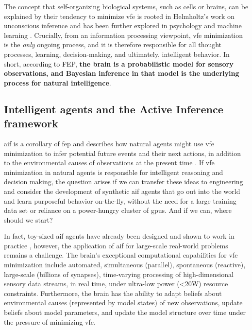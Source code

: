 The concept that self-organizing biological systems, such as cells or brains, can be explained by their tendency to minimize \ac{vfe} is rooted in Helmholtz's work on unconscious inference \citep{helmholtz66, meyering_helmholtzs_1989} and has been further explored in psychology \citep{gregory_perceptions_1980} and machine learning \citep{dayan_helmholtz_1995}. 
Crucially, from an information processing viewpoint, \ac{vfe} minimization is the \textit{only}
ongoing process, and it is therefore responsible for all thought processes, learning,
decision-making, and ultimately, intelligent behavior.
In short, according to FEP, \textbf{the brain is a probabilistic model for sensory observations, and Bayesian inference in that model is the underlying process for natural intelligence}.

\subsection{Intelligent agents and the Active Inference framework}

\Ac{aif} is a corollary of \ac{fep} and describes how
natural agents might use \ac{vfe} minimization to infer potential future events and their next actions, in addition to the environmental causes of observations at the present time \citep{smith_step-by-step_2021, de_vries_factor_2017}.
If \ac{vfe} minimization in natural agents is responsible for intelligent reasoning and
decision making, the question arises if we can transfer these ideas to engineering and
consider the development of synthetic \ac{aif} agents that go out into the world and learn
purposeful behavior on-the-fly, without the need for a large training data set or reliance on
a power-hungry cluster of \acp{gpu}. And if we can, where should we start?

In fact, toy-sized \ac{aif} agents have already been designed and shown to work in practice
\citep{friston_active_2016,pio-lopez_active_2016,da_costa_active_2020,van_de_laar_active_2022, koudahl_realising_2023, van_de_laar_realising_2023},
however, the application of \ac{aif} for large-scale real-world problems remains a challenge.
The brain's exceptional computational capabilities for \ac{vfe} minimization include automated,
simultaneous (parallel), spontaneous (reactive), large-scale (billions of synapses),
time-varying processing of high-dimensional sensory data streams, in real time, under
ultra-low power (<20W) resource constraints.
Furthermore, the brain has the ability to adapt beliefs about environmental causes
(represented by model states) of new observations, update beliefs about model
parameters, and update the model structure over time under the pressure of minimizing
\ac{vfe}.

